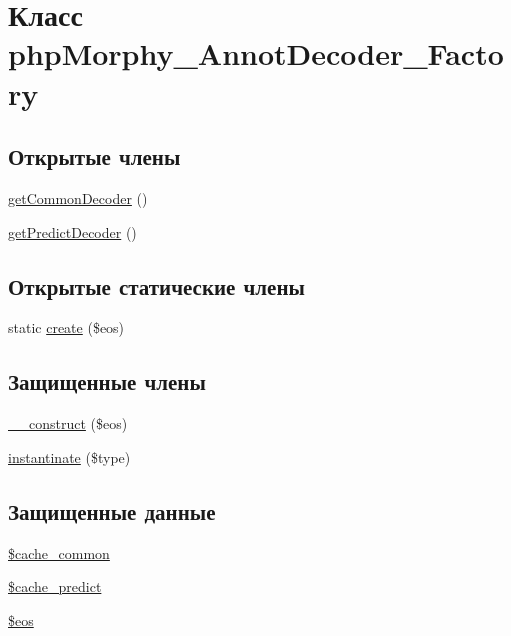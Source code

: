 \hypertarget{classphpMorphy__AnnotDecoder__Factory}{
\section{Класс phpMorphy\_\-AnnotDecoder\_\-Factory}
\label{classphpMorphy__AnnotDecoder__Factory}
}
\subsection*{Открытые члены}
\begin{DoxyCompactItemize}
\item 
\hyperlink{classphpMorphy__AnnotDecoder__Factory_ad2141ee012f0d7c655604a44fd92d213}{getCommonDecoder} ()
\item 
\hyperlink{classphpMorphy__AnnotDecoder__Factory_ab19576908d6cd8a4bf1bac7f007fd884}{getPredictDecoder} ()
\end{DoxyCompactItemize}
\subsection*{Открытые статические члены}
\begin{DoxyCompactItemize}
\item 
static \hyperlink{classphpMorphy__AnnotDecoder__Factory_ad3038177ad4daa1d0596ff423cf99560}{create} (\$eos)
\end{DoxyCompactItemize}
\subsection*{Защищенные члены}
\begin{DoxyCompactItemize}
\item 
\hyperlink{classphpMorphy__AnnotDecoder__Factory_a1bb03727ef4536dc5ffce1ee51417b17}{\_\-\_\-construct} (\$eos)
\item 
\hyperlink{classphpMorphy__AnnotDecoder__Factory_aaf1159f3468208844ab3823c41417bb1}{instantinate} (\$type)
\end{DoxyCompactItemize}
\subsection*{Защищенные данные}
\begin{DoxyCompactItemize}
\item 
\hyperlink{classphpMorphy__AnnotDecoder__Factory_a0a5545fa66a128b4a663a22927d6f205}{\$cache\_\-common}
\item 
\hyperlink{classphpMorphy__AnnotDecoder__Factory_ac23ade1051f2fabc200a93872d4b28a1}{\$cache\_\-predict}
\item 
\hyperlink{classphpMorphy__AnnotDecoder__Factory_a81289f035d987b9afe3cf34b628a920d}{\$eos}
\end{DoxyCompactItemize}
